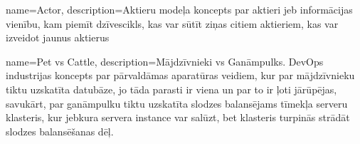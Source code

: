 {
    name=Actor,
    description={Aktieru modeļa koncepts par aktieri jeb informācijas vienību, kam piemīt dzīvescikls, 
        kas var sūtīt ziņas citiem aktieriem, kas var izveidot jaunus aktierus}
}

{
    name=Pet vs Cattle,
    description={Mājdzīvnieki vs Ganāmpulks. DevOps industrijas koncepts par pārvaldāmas aparatūras veidiem, kur
        par mājdzīvnieku tiktu uzskatīta datubāze, jo tāda parasti ir viena un par to ir ļoti jārūpējas, savukārt,
        par ganāmpulku tiktu uzskatīta slodzes balansējams tīmekļa serveru klasteris, kur jebkura servera instance
        var salūzt, bet klasteris turpinās strādāt slodzes balansēšanas dēļ.}
}